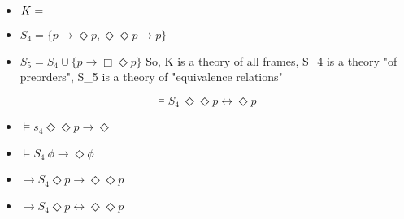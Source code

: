 {
    \begin{itemize}
            \item $K = \empty$
            \item  $S_4 = \{ p \rightarrow \Diamond p, \Diamond \Diamond p \rightarrow p \} $
            \item $S_5 = S_4 \cup \{ p \rightarrow \Box \Diamond p\} $ 
So, K is a theory of all frames, S_4 is a theory "of preorders", S_5 is a theory of "equivalence relations"



            
    \end{itemize}
%                          
%                          
%                          
%                  
%
    {
        \begin{equation}
            \vDash S_4 \: \Diamond \Diamond p \leftrightarrow \Diamond p      
        \end{equation}

    }

    \begin{myproof}
        \begin{itemize}
                \item $ \vDash s_4 \Diamond \Diamond p \rightarrow \Diamond       $ 
                \item $ \vDash S_4 \: \phi \rightarrow \Diamond  \phi  $ 
                \item $ \rightarrow  S_4 \Diamond p \rightarrow \Diamond \Diamond p      $ 
                \item $ \rightarrow S_4 \Diamond p \leftrightarrow \Diamond \Diamond p      $
        \end{itemize}




\end{myproof}}
